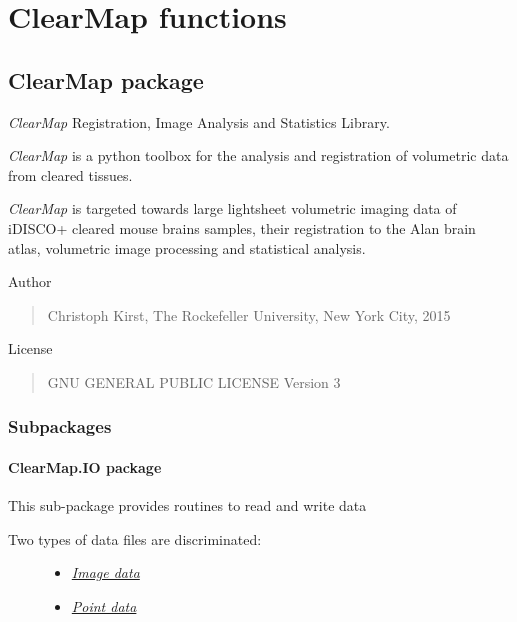 \documentclass[letterpaper,10pt,english]{sphinxmanual}
\begin{document}
\chapter{ClearMap functions}
\label{index:clearmap-functions}

\section{ClearMap package}
\label{api/ClearMap:clearmap-package}\label{api/ClearMap::doc}\label{api/ClearMap:module-ClearMap}
\emph{ClearMap} Registration, Image Analysis and Statistics Library.

\emph{ClearMap} is a python toolbox for the analysis and registration of volumetric
data from cleared tissues.

\emph{ClearMap} is targeted towards large lightsheet volumetric imaging data
of iDISCO+ cleared mouse brains samples, their registration to the Alan brain atlas,
volumetric image processing and statistical analysis.

Author
\begin{quote}

Christoph Kirst,
The Rockefeller University, New York City, 2015
\end{quote}

License
\begin{quote}

GNU GENERAL PUBLIC LICENSE Version 3
\end{quote}


\subsection{Subpackages}
\label{api/ClearMap:subpackages}

\subsubsection{ClearMap.IO package}
\label{api/ClearMap.IO:clearmap-io-package}\label{api/ClearMap.IO::doc}\label{api/ClearMap.IO:module-ClearMap.IO}
This sub-package provides routines to read and write data
\begin{description}
\item[{Two types of data files are discriminated:}] \leavevmode\begin{itemize}
\item {} 
{\hyperref[api/ClearMap.IO:image-data]{\emph{Image data}}}

\item {} 
{\hyperref[api/ClearMap.IO:point-data]{\emph{Point data}}}

\end{itemize}

\end{description}
\end{document}
